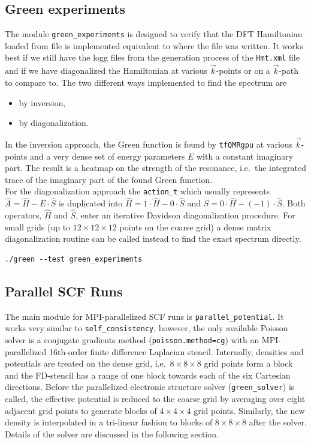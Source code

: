 \documentclass[oribibl]{llncs}
\newcommand{\ttt}[1]{\texttt{#1}}
\begin{document}
\subsection{Green experiments} \label{sec:green-experiments}
The module \ttt{green\_experiments} is designed to verify that the \ac{DFT} Hamiltonian loaded from file
is implemented equivalent to where the file was written.
It works best if we still have the logg files from the generation process of the \ttt{Hmt.xml} file 
and if we have diagonalized the Hamiltonian at various $\vec{k}$-points or on a $\vec{k}$-path to compare to.
The two different ways implemented to find the spectrum are
\begin{itemize}
  \item by inversion,
  \item by diagonalization.
\end{itemize}
In the inversion approach, the Green function is found by \ttt{tfQMRgpu} at various $\vec{k}$-points
and a very dense set of energy parameters $E$ with a constant imaginary part.
The result is a heatmap on the strength of the resonance, 
i.e.~the integrated trace of the imaginary part of the found Green function.\\
For the diagonalization approach the \ttt{action\_t} which usually represents $\hat A = \hat H - E\cdot \hat S$ is duplicated into $\hat H = 1\cdot \hat H - 0\cdot\hat S$ and $\hat S = 0\cdot \hat H - (-1)\cdot\hat S$.
Both operators, $\hat H$ and $\hat S$, enter an iterative Davidson diagonalization procedure. For small grids (up to $12 \times 12 \times 12$ points on the coarse grid) a dense matrix diagonalization routine can be called instead to find the exact spectrum directly.
\begin{verbatim}
./green --test green_experiments
\end{verbatim}

\subsection{Parallel SCF Runs}
The main module for \ac{MPI}-parallelized \ac{SCF} runs is \ttt{parallel\_potential}.
It works very similar to \ttt{self\_consistency}, however, the only available Poisson solver
is a conjugate gradients method (\ttt{poisson.method=cg}) with an \ac{MPI}-parallelized 16th-order finite difference Laplacian stencil.
Internally, densities and potentials are treated on the dense grid, i.e.~$8 \times 8 \times 8$ grid points form a block and the FD-stencil has a range of one block towards each of the six Cartesian directions.
Before the parallelized electronic structure solver (\ttt{green\_solver}) is called, the effective potential is
reduced to the coarse grid by averaging over eight adjacent grid points to generate blocks of $4 \times 4 \times 4$ grid points. Similarly, the new density is interpolated in a tri-linear fashion to blocks of $8 \times 8 \times 8$ after the solver. Details of the solver are discussed in the following section.
\end{document}
